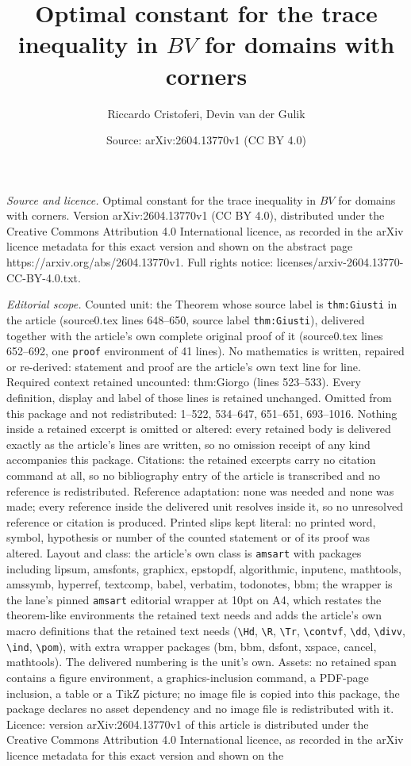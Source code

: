 \documentclass[10pt,a4paper]{amsart}
\title[Optimal constant for the trace inequality in $BV$ for domain]{Optimal constant for the trace inequality in $BV$ for domains with corners}
\author{Riccardo Cristoferi, Devin van der Gulik}
\date{Source: arXiv:2604.13770v1 (CC BY 4.0)}
\begin{document}
\maketitle

\noindent\emph{Source and licence.} Optimal constant for the trace inequality in $BV$ for domains with corners. Version arXiv:2604.13770v1 (CC BY 4.0), distributed under the Creative Commons Attribution 4.0 International licence, as recorded in the arXiv licence metadata for this exact version and shown on the abstract page https://arxiv.org/abs/2604.13770v1. Full rights notice: licenses/arxiv-2604.13770-CC-BY-4.0.txt.\par\smallskip

\noindent\textit{Editorial scope.} Counted unit: the Theorem whose source label is \texttt{thm:Giusti} in the article (source0.tex lines 648--650, source label \texttt{thm:Giusti}), delivered together with the article's own complete original proof of it (source0.tex lines 652--692, one \texttt{proof} environment of 41 lines). No mathematics is written, repaired or re-derived: statement and proof are the article's own text line for line. Required context retained uncounted: thm:Giorgo (lines 523--533). Every definition, display and label of those lines is retained unchanged. Omitted from this package and not redistributed: 1--522, 534--647, 651--651, 693--1016. Nothing inside a retained excerpt is omitted or altered: every retained body is delivered exactly as the article's lines are written, so no omission receipt of any kind accompanies this package. Citations: the retained excerpts carry no citation command at all, so no bibliography entry of the article is transcribed and no reference is redistributed. Reference adaptation: none was needed and none was made; every reference inside the delivered unit resolves inside it, so no unresolved reference or citation is produced. Printed slips kept literal: no printed word, symbol, hypothesis or number of the counted statement or of its proof was altered. Layout and class: the article's own class is \texttt{amsart} with packages including lipsum, amsfonts, graphicx, epstopdf, algorithmic, inputenc, mathtools, amssymb, hyperref, textcomp, babel, verbatim, todonotes, bbm; the wrapper is the lane's pinned \texttt{amsart} editorial wrapper at 10pt on A4, which restates the theorem-like environments the retained text needs and adds the article's own macro definitions that the retained text needs (\texttt{\textbackslash Hd}, \texttt{\textbackslash R}, \texttt{\textbackslash Tr}, \texttt{\textbackslash contvf}, \texttt{\textbackslash dd}, \texttt{\textbackslash divv}, \texttt{\textbackslash ind}, \texttt{\textbackslash pom}), with extra wrapper packages (bm, bbm, dsfont, xspace, cancel, mathtools). The delivered numbering is the unit's own. Assets: no retained span contains a figure environment, a graphics-inclusion command, a PDF-page inclusion, a table or a TikZ picture; no image file is copied into this package, the package declares no asset dependency and no image file is redistributed with it. Licence: version arXiv:2604.13770v1 of this article is distributed under the Creative Commons Attribution 4.0 International licence, as recorded in the arXiv licence metadata for this exact version and shown on the 
\end{document}

